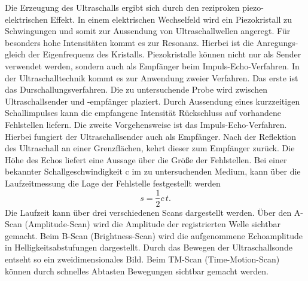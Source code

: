 Die Erzeugung des Ultraschalls ergibt sich durch den reziproken piezo-elektrischen Effekt.
In einem elektrischen Wechselfeld wird ein Piezokristall zu Schwingungen und somit zur
Aussendung von Ultraschallwellen angeregt. Für besonders hohe Intensitäten kommt es
zur Resonanz. Hierbei ist die Anregungs- gleich der Eigenfrequenz des Kristalls.
Piezokristalle können nicht nur als Sender verwendet werden, sondern auch als Empfänger
beim Impuls-Echo-Verfahren.
\newline
In der Ultraschalltechnik kommt es zur Anwendung zweier Verfahren.
\newline
Das erste ist das Durschallungsverfahren. Die zu untersuchende Probe wird zwischen Ultraschallsender und
-empfänger plaziert. Durch Aussendung eines kurzzeitigen Schallimpulses kann die empfangene
Intensität Rückschluss auf vorhandene Fehlstellen liefern.
\newline
Die zweite Vorgehensweise ist das Impuls-Echo-Verfahren. Hierbei fungiert der Ultraschallsender
auch als Empfänger. Nach der Reflektion des Ultraschall an einer Grenzflächen, kehrt dieser
zum Empfänger zurück. Die Höhe des Echos liefert eine Aussage über die Größe der Fehlstellen.
Bei einer bekannter Schallgeschwindigkeit c im zu untersuchenden Medium, kann über die Laufzeitmessung
die Lage der Fehlstelle festgestellt werden
\begin{equation}
  s = \frac{1}{2} c\,t.
\end{equation}
Die Laufzeit kann über drei verschiedenen Scans dargestellt werden.
Über den A-Scan (Amplitude-Scan) wird die Amplitude der registrierten Welle sichtbar gemacht.
Beim B-Scan (Brightness-Scan) wird die aufgenommene Echoamplitude in Helligkeitsabstufungen dargestellt.
Durch das Bewegen der Ultraschallsonde entseht so ein zweidimensionales Bild.
Beim TM-Scan (Time-Motion-Scan) können durch schnelles Abtasten Bewegungen sichtbar gemacht werden.

